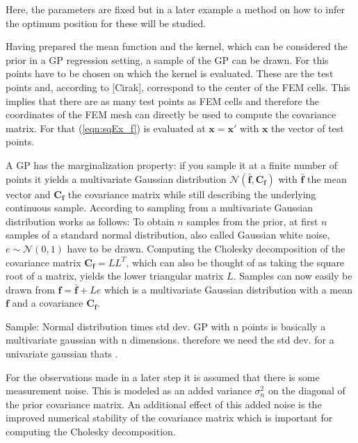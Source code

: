 \documentclass[%
  a4paper,oneside,%
  11pt,%
  smallchapters,
  style=printdev,
  extramargin,
  green,%
  rgb, <cmyk>
  ]{tubsbook}
\begin{document}
%
Here, the parameters are fixed but in a later example a method on how to infer the optimum position for these will be studied.

Having prepared the mean function and the kernel, which can be considered the prior in a GP regression setting, a sample of the GP can be drawn. For this points have to be chosen on which the kernel is evaluated. These are the test points and, according to [Cirak], correspond to the center of the FEM cells. This implies that there are as many test points as FEM cells and therefore the coordinates of the FEM mesh can directly be used to compute the covariance matrix. For that (\ref{eqn:sqEx_f}) is evaluated at $\bm{x} = \bm{x}'$ with $\bm{x}$ the vector of test points. 

A GP has the marginalization property: if you sample it at a finite number of points it yields a multivariate Gaussian distribution $\mathcal{N}(\bar{\bm{f}},\bm{C_f})$ with $\bar{\bm{f}}$ the mean vector and $\bm{C_f}$ the covariance matrix while still describing the underlying continuous sample.
According to \cite{rasmussen2006} sampling from a multivariate Gaussian distribution works as follows: To obtain $n$ samples from the prior, at first $n$ samples of a standard normal distribution, also called Gaussian white noise, $e \sim \mathcal{N}(0,1)$ have to be drawn. Computing the Cholesky decomposition of the covariance matrix $\bm{C_f} = LL^T$, which can also be thought of as taking the square root of a matrix, yields the lower triangular matrix $L$. Samples can now easily be drawn from $\bm{f} = \bar{\bm{f}} + Le$ which is a multivariate Gaussian distribution with a mean $\bm{f}$ and a covariance $\bm{C_f}$.

Sample: Normal distribution times std dev. GP with n points is basically a multivariate gaussian with n dimensions. therefore we need the std dev. for a univariate gaussian thats . 

For the observations made in a later step it is assumed that there is some measurement noise. This is modeled as an added variance $\sigma_{n}^2$ on the diagonal of the prior covariance matrix. An additional effect of this added noise is the improved numerical stability of the covariance matrix which is important for computing the Cholesky decomposition.
\end{document}
